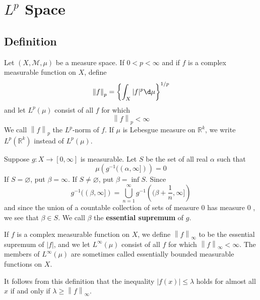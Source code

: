 \documentclass[12pt, a4paper, oneside]{book}
\begin{document}
\chapter{\texorpdfstring{$L^p$}{} Space}

\section{Definition}
\begin{definition}
    Let $\left(X,\mathcal{M},\mu\right)$ be a measure space.
    If $ 0<p<\infty$ and if $f$ is a complex measurable function on $X$, define
    \begin{equation*}
        \left\| f \right\|_{p}=\left\{\int_{X} |f|^{p} \d  \mu\right\}^{1 / p}
    \end{equation*}
    and let $L^{p}(\mu)$ consist of all $f$ for which
    \begin{equation*}
        \left\| f \right\|_{p}<\infty
    \end{equation*}
    We call $\left\| f \right\|_{p}$ the $L^p$-norm of $f$.
    If $\mu$ is Lebesgue measure on $\mathbb{R}^{k}$, we write $L^{p}\left(\mathbb{R}^{k}\right)$ instead of $L^{p}(\mu)$.
\end{definition}
\begin{definition}
    Suppose $g: X \longrightarrow [0, \infty]$ is measurable. Let $S$ be the set of all real $\alpha$ such that
    \begin{equation*}
        \mu\left(g^{-1}((\alpha, \infty])\right)=0
    \end{equation*}
    If $S=\varnothing$, put $\beta=\infty$. If $S \neq \varnothing$, put $\beta=\inf S$. Since
    \begin{equation*}
        g^{-1}((\beta, \infty]) = \bigcup_{n=1}^{\infty} g^{-1} \left((\beta+\frac{1}{n}, \infty]\right)
    \end{equation*}
    and since the union of a countable collection of sets of measure 0 has measure 0 , we see that $\beta \in S$. We call $\beta$ the \textbf{essential supremum} of $g$.

    If $f$ is a complex measurable function on $X$, we define $\left\| f \right\|_{\infty}$ to be the essential supremum of $|f|$, and we let $L^{\infty}(\mu)$ consist of all $f$ for which $\left\| f \right\|_{\infty}<\infty$. The members of $L^{\infty}(\mu)$ are sometimes called essentially bounded measurable functions on $X$.

    \begin{remark}
        It follows from this definition that the inequality $|f(x)| \leq \lambda$ holds for almost all $x$ if and only if $\lambda \geq\left\| f \right\|_{\infty}$.
    \end{remark}
\end{definition}
\end{document}
